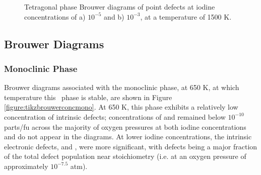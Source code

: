 \begin{landscape}
\begin{figure}[ht]
\begin{center}
		\caption{Tetragonal phase Brouwer diagrams of point defects at iodine concentrations of a) $10^{-5}$ and b) $10^{-3}$, at a temperature of 1500 K.}
		\label{figure:tikzbrouwerconctet}
	\end{center}
\end{figure}
\end{landscape}

\subsection{Brouwer Diagrams} \label{Formation}

\subsubsection*{Monoclinic Phase}

Brouwer diagrams associated with the monoclinic phase, at 650 K, at which temperature this \zirconia\ phase is stable, are shown in Figure \ref{figure:tikzbrouwerconcmono}. At 650 K, this phase exhibits a relatively low concentration of intrinsic defects; concentrations of  and  remained below $10^{-10}$ parts/fu across the majority of oxygen pressures at both iodine concentrations and do not appear in the diagrams. At lower iodine concentrations, the intrinsic electronic defects,  and , were more significant, with  defects being a major fraction of the total defect population near stoichiometry (i.e. at an oxygen pressure of approximately $10^{-7.5}$ atm). 

